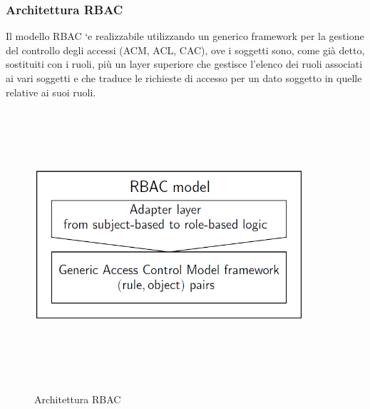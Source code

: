 \subsubsection{Architettura RBAC}
Il modello RBAC `e realizzabile utilizzando un generico framework per la gestione del controllo degli accessi (ACM, ACL, CAC), ove i soggetti sono, come già detto, sostituiti con i ruoli, più un layer superiore che gestisce l'elenco dei ruoli associati ai vari soggetti e che traduce le richieste di accesso per un dato soggetto in quelle relative ai suoi ruoli.
\begin{figure}[htbp]
	\centering%
	\subfigure%
	{\includegraphics[height=10cm, width=10cm, keepaspectratio]{Immagini/Capitolo1/RBAC_arch.png}}
	\caption{Architettura RBAC \label{fig:RBAC_arch}} 	
\end{figure}

